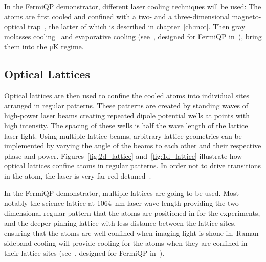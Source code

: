 In the FermiQP demonstrator, different laser cooling techniques will be used: The atoms are first cooled and confined with a two- and a three-dimensional magneto-optical trap~\cite{foot_atomic_2005}, the latter of which is described in chapter~\ref{ch:mot}. Then gray molasses cooling~\cite{weidemuller_novel_1994} and evaporative cooling (see~\cite{foot_atomic_2005}, designed for FermiQP in~\cite{sun_construction_2022}), bring them into the \si[]{\micro\kelvin} regime.

\subsection*{Optical Lattices}\label{ch:optical_lattices}
Optical lattices are then used to confine the cooled atoms into individual sites arranged in regular patterns. These patterns are created by standing waves of high-power laser beams creating repeated dipole potential wells at points with high intensity. The spacing of these wells is half the wave length of the lattice laser light. Using multiple lattice beams, arbitrary lattice geometries can be implemented by varying the angle of the beams to each other and their respective phase and power. Figures~\ref{fig:2d_lattice} and~\ref{fig:1d_lattice} illustrate how optical lattices confine atoms in regular patterns. In order not to drive transitions in the atom, the laser is very far red-detuned~\cite{bloch_many-body_2008, bloch_quantum_2012}.

In the FermiQP demonstrator, multiple lattices are going to be used. Most notably the science lattice at \SI[]{1064}{\nano\meter} laser wave length providing the two-dimensional regular pattern that the atoms are positioned in for the experiments, and the deeper pinning lattice with less distance between the lattice sites, ensuring that the atoms are well-confined when imaging light is shone in. Raman sideband cooling will provide cooling for the atoms when they are confined in their lattice sites (see~\cite*{hilker_spin-resolved_2017}, designed for FermiQP in~\cite{krumm_notitle_2022}).

